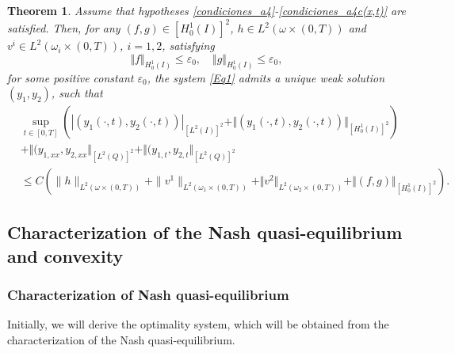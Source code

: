 \documentclass[11pt,a4paper]{amsart}
\numberwithin{equation}{section}
\newtheorem{theorem}{Theorem}[section]
\begin{document}
\begin{theorem}\label{wellpo_nondege}
Assume that hypotheses \eqref{condiciones_a4}-\eqref{condiciones_a4c(x,t)} are satisfied. Then, for any $(f, g)\in [H^1_0(I)]^2$,    $h  \in L^2(\omega\times (0,T))$ and $v^i\in L^2(\omega_i \times (0,T))$, $i=1, 2$, satisfying $$ \Vert f \Vert_{H_0^1(I)}\leq \varepsilon_0,\quad \Vert g \Vert_{H_0^1(I)}\leq\varepsilon_0,$$ for some positive constant $\varepsilon_0$,  the system \eqref{Eq1} admits a unique weak solution $(y_1, y_2)$, such that
\begin{equation}\label{lmiwellpos}
\begin{split}
  &\sup_{t\in\left[0,T\right]} \left( |(y_1(\cdot, t),y_2(\cdot, t))|_{[L^2(I)]^2}+ \Vert (y_1(\cdot,t),y_2(\cdot,t))\Vert_{[H^1_0(I)]^2} \right) \\
 &+\Vert (y_{1,xx},y_{2,xx}\Vert_{[L^2(Q)]^2}  +\Vert (y_{1,t},y_{2,t}\Vert_{[L^2(Q)]^2} \\
&\leq C\left( \|h\|_{L^2(\omega\times (0,T))}  + \|v^1\|_{L^2(\omega_1\times (0,T))} + \Vert v^2 \Vert_{L^2(\omega_2\times (0,T))} +\Vert (f, g)\Vert_{[H^1_0(I)]^2}\right).   
\end{split}
\end{equation}
\end{theorem}


\subsection{\bf Characterization of the Nash quasi-equilibrium and convexity}

\subsubsection{Characterization of Nash quasi-equilibrium}

Initially, we will derive the optimality system, which will be obtained from the characterization of the Nash quasi-equilibrium.
\end{document}
